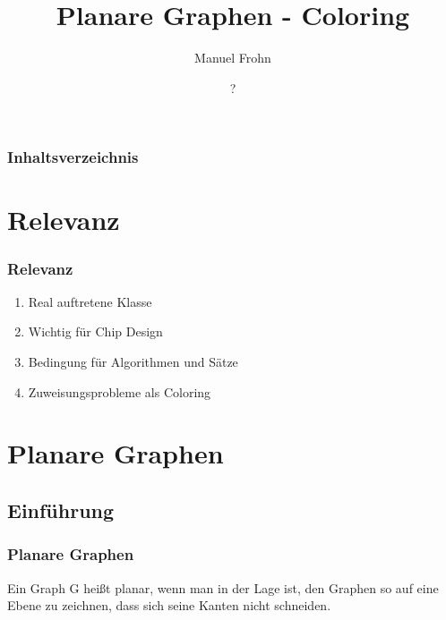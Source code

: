 \documentclass{beamer}
\author{Manuel Frohn}
\title{Planare Graphen - Coloring}
\institute{RWTH Aachen University, Aachen, Germany}
\date{?}
\begin{document}
    \begin{frame}
        \maketitle
    \end{frame}

    \begin{frame}
        \frametitle{Inhaltsverzeichnis}
        \tableofcontents
    \end{frame}

    \section{Relevanz}

    \begin{frame}
        \frametitle{Relevanz}
        \begin{enumerate}
            \item Real auftretene Klasse
            \item Wichtig für Chip Design
            \item Bedingung für Algorithmen und Sätze
            \item Zuweisungsprobleme als Coloring
        \end{enumerate}
    \end{frame}

    \section{Planare Graphen}
    \subsection{Einführung}

    \begin{frame}
        \frametitle{Planare Graphen}
        \begin{definition}[Planarität]
            Ein Graph G heißt planar, wenn man in der Lage
            ist, den Graphen so auf eine Ebene zu zeichnen, dass sich seine Kanten nicht
            schneiden.          
        \end{definition}
    \end{frame}
    
\end{document}
